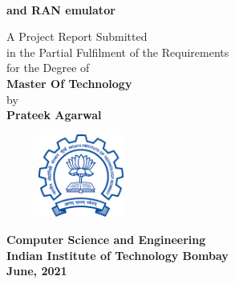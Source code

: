\titlepage
\begin{center}

\\
 {\bf{\Large{and RAN emulator}}}\\
\end{center}
\vspace{25mm}
\begin{center}
A Project Report Submitted\\
in the Partial Fulfilment of the Requirements
\\
for the Degree of
\\
\vspace{30mm}
{\bf {\large Master Of Technology}}
\\
by
\\
{\bf{\Large Prateek Agarwal}}\\
\end{center}
\vspace{20mm}
\begin{figure}[h]
\centering
\includegraphics[width=0.25\textwidth]{./fig/iitblogo.png}

\end{figure}
\begin{center}
\vspace{3mm}
{\bf {\large {Computer Science and Engineering}}}\\
\vspace{2mm}
{\bf {\large {Indian Institute of Technology Bombay}}}\\
\vspace{3mm}
{\textbf{ June, 2021}}\\
\end{center}
